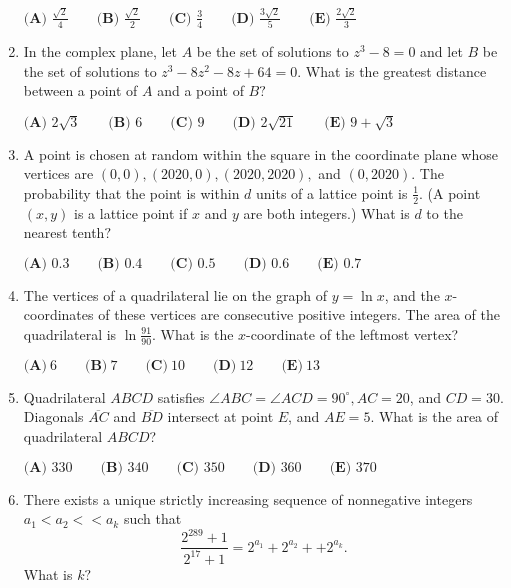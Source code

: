 \documentclass{article}
\begin{document}
\begin{enumerate}[label=\arabic*., itemsep=0.5em]
\(\textbf{(A) } \frac{\sqrt{2}}{4} \qquad \textbf{(B) } \frac{\sqrt{2}}{2} \qquad \textbf{(C) } \frac{3}{4} \qquad \textbf{(D) } \frac{3\sqrt{2}}{5} \qquad \textbf{(E) } \frac{2\sqrt{2}}{3}\)\par \vspace{0.5em}\item In the complex plane, let \(A\) be the set of solutions to \(z^3 - 8 = 0\) and let \(B\) be the set of solutions to \(z^3 - 8z^2 - 8z + 64 = 0\). What is the greatest distance between a point of \(A\) and a point of \(B?\)

\(\textbf{(A) } 2\sqrt{3} \qquad \textbf{(B) } 6 \qquad \textbf{(C) } 9 \qquad \textbf{(D) } 2\sqrt{21} \qquad \textbf{(E) } 9 + \sqrt{3}\)\par \vspace{0.5em}\item A point is chosen at random within the square in the coordinate plane whose vertices are \((0, 0), (2020, 0), (2020, 2020),\) and \((0, 2020)\). The probability that the point is within \(d\) units of a lattice point is \(\tfrac{1}{2}\). (A point \((x, y)\) is a lattice point if \(x\) and \(y\) are both integers.) What is \(d\) to the nearest tenth\(?\)

\(\textbf{(A) } 0.3 \qquad \textbf{(B) } 0.4 \qquad \textbf{(C) } 0.5 \qquad \textbf{(D) } 0.6 \qquad \textbf{(E) } 0.7\)\par \vspace{0.5em}\item The vertices of a quadrilateral lie on the graph of \(y = \ln x\), and the \(x\)-coordinates of these vertices are consecutive positive integers. The area of the quadrilateral is \(\ln \frac{91}{90}\). What is the \(x\)-coordinate of the leftmost vertex?

\(\textbf{(A)}\ 6\qquad\textbf{(B)}\ 7\qquad\textbf{(C)}\ 10\qquad\textbf{(D)}\ 12\qquad\textbf{(E)}\ 13\)\par \vspace{0.5em}\item Quadrilateral \(ABCD\) satisfies \(\angle ABC = \angle ACD = 90^{\circ}, AC = 20\), and \(CD = 30\). Diagonals \(\overline{AC}\) and \(\overline{BD}\) intersect at point \(E\), and \(AE = 5\). What is the area of quadrilateral \(ABCD\)?

\(\textbf{(A) } 330 \qquad\textbf{(B) } 340 \qquad\textbf{(C) } 350 \qquad\textbf{(D) } 360 \qquad\textbf{(E) } 370\)\par \vspace{0.5em}\item There exists a unique strictly increasing sequence of nonnegative integers \(a_1 < a_2 <  < a_k\) such that
\begin{equation*}
\frac{2^{289}+1}{2^{17}+1} = 2^{a_1} + 2^{a_2} +  + 2^{a_k}.
\end{equation*}
What is \(k?\)


\end{enumerate}
\end{document}
